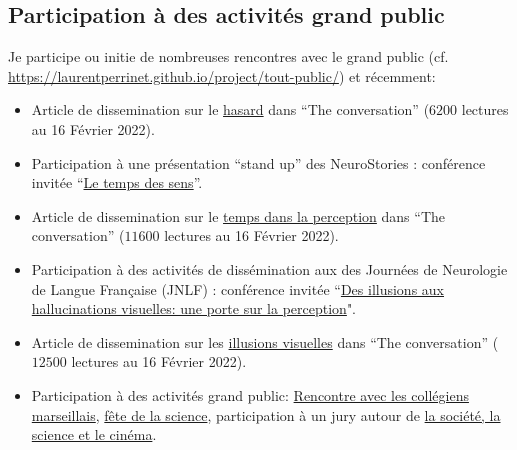 \documentclass[10pt,french,a4paper,oneside]{article}%
\newcommand{\years}[1]{\marginpar{\textit{\scriptsize #1}}}
\begin{document}
\subsection{Participation à des activités grand public} %

Je participe ou initie de nombreuses rencontres avec le grand public (cf. \url{https://laurentperrinet.github.io/project/tout-public/}) et récemment:

\begin{itemize}

	\item Article de dissemination sur le \href{https://laurentperrinet.github.io/publication/perrinet-21-hasard/}{hasard} dans ``The conversation'' ($6200$ lectures au 16 Février 2022).

	\item Participation à une présentation ``stand up'' des NeuroStories : conférence invitée  ``\href{https://laurentperrinet.github.io/post/2019-10-07_neurostories/}{Le temps des sens}''.

	\item Article de dissemination sur le \href{https://laurentperrinet.github.io/publication/perrinet-19-temps/}{temps dans la perception} dans ``The conversation'' ($11600$ lectures au 16 Février 2022).

	\item Participation à des activités de dissémination aux des Journées de Neurologie de Langue Française (JNLF) : conférence invitée  ``\href{https://laurentperrinet.github.io/talk/2019-04-18-jnlf/}{Des illusions aux hallucinations visuelles: une porte sur la perception}".

	\item Article de dissemination sur les \href{https://theconversation.com/illusions-et-hallucinations-visuelles-une-porte-sur-la-perception-117389}{illusions visuelles} dans ``The conversation'' ($12500$ lectures au 16 Février 2022).

	\item Participation à des activités grand public: \href{https://laurentperrinet.github.io/talk/2019-01-10-polly-maggoo/}{Rencontre avec les collégiens marseillais}, \href{https://laurentperrinet.github.io/talk/2018-10-10-polly-maggoo/}{fête de la science}, participation à un jury autour de \href{https://laurentperrinet.github.io/talk/2017-11-17-festival-interferences/}{la société, la science et le cinéma}.


%
%
%


\end{itemize}
\end{document}
